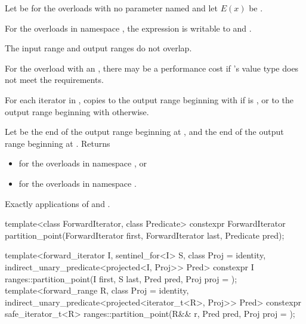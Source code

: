 \begin{itemdescr}
\pnum
Let  be 
for the overloads with no parameter named  and
let $E(x)$ be .

\pnum
\mandates
For the overloads in namespace ,
the expression 
is writable
to  and .

\pnum
\expects
The input range and output ranges do not overlap.

\begin{note}
For the overload with an ,
there may be a performance cost if 's value type
does not meet the  requirements.
\end{note}

\pnum
\effects
For each iterator  in ,
copies  to the output range beginning with 
if  is , or
to the output range beginning with  otherwise.

\pnum
\returns
Let  be the end of the output range beginning at ,
and  the end of the output range beginning at .
Returns
\begin{itemize}
\item {} for the overloads in namespace , or
\item {} for the overloads in namespace .
\end{itemize}

\pnum
\complexity
Exactly  applications of  and .
\end{itemdescr}

%
\begin{itemdecl}
template<class ForwardIterator, class Predicate>
  constexpr ForwardIterator
    partition_point(ForwardIterator first, ForwardIterator last, Predicate pred);

template<forward_iterator I, sentinel_for<I> S, class Proj = identity,
         indirect_unary_predicate<projected<I, Proj>> Pred>
  constexpr I ranges::partition_point(I first, S last, Pred pred, Proj proj = {});
template<forward_range R, class Proj = identity,
         indirect_unary_predicate<projected<iterator_t<R>, Proj>> Pred>
  constexpr safe_iterator_t<R>
    ranges::partition_point(R&& r, Pred pred, Proj proj = {});
\end{itemdecl}

